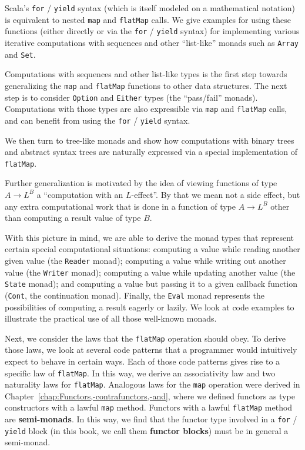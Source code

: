 Scala\textsf{'}s \lstinline!for! / \lstinline!yield! syntax (which is itself
modeled on a mathematical notation) is equivalent to nested \lstinline!map!
and \lstinline!flatMap! calls. We give examples for using these functions
(either directly or via the \lstinline!for! / \lstinline!yield!
syntax) for implementing various iterative computations with sequences
and other \textsf{``}list-like\textsf{''} monads such as \lstinline!Array! and \lstinline!Set!.

Computations with sequences and other list-like types is the first
step towards generalizing the \lstinline!map! and \lstinline!flatMap!
functions to other data structures. The next step is to consider \lstinline!Option!
and \lstinline!Either! types (the \textsf{``}pass/fail\textsf{''} monads). Computations
with those types are also expressible via \lstinline!map! and \lstinline!flatMap!
calls, and can benefit from using the \lstinline!for! / \lstinline!yield!
syntax.

We then turn to tree-like monads and show how computations with binary
trees and abstract syntax trees are naturally expressed via a special
implementation of \lstinline!flatMap!.

Further generalization is motivated by the idea of viewing functions
of type $A\rightarrow L^{B}$ a \textsf{``}computation with an $L$-effect\textsf{''}.
By that we mean not a side effect, but any extra computational work
that is done in a function of type $A\rightarrow L^{B}$ other than
computing a result value of type $B$.

With this picture in mind, we are able to derive the monad types that
represent certain special computational situations: computing a value
while reading another given value (the \lstinline!Reader! monad);
computing a value while writing out another value (the \lstinline!Writer!
monad); computing a value while updating another value (the \lstinline!State!
monad); and computing a value but passing it to a given callback function
(\lstinline!Cont!, the continuation monad). Finally, the \lstinline!Eval!
monad represents the possibilities of computing a result eagerly or
lazily. We look at code examples to illustrate the practical use of
all those well-known monads. 

Next, we consider the laws that the \lstinline!flatMap! operation
should obey. To derive those laws, we look at several code patterns
that a programmer would intuitively expect to behave in certain ways.
Each of those code patterns gives rise to a specific law of \lstinline!flatMap!.
In this way, we derive an associativity law and two naturality laws
for \lstinline!flatMap!. Analogous laws for the \lstinline!map!
operation were derived in Chapter~\ref{chap:Functors,-contrafunctors,-and},
where we defined functors as type constructors with a lawful \lstinline!map!
method. Functors with a lawful \lstinline!flatMap! method are \textbf{semi-monads}.
In this way, we find that the functor type involved in a \lstinline!for!
/ \lstinline!yield! block (in this book, we call them \textbf{functor
blocks}) must be in general a semi-monad.

